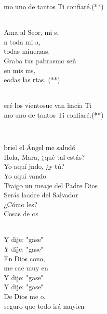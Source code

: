 \documentclass[12pt]{article}
\begin{document}
\begin{multicols*}{2}
\begin{cancion}[Hacia Ti][Ixcís]
\begin{chorus}
	mo uno de tantos Ti confiaré.(**)\\
	\end{chorus}%
	\jump\\
	Ama al Seor, mi s, \\
	n toda mi a, \\
	 todas miuerzas.\\
	Graba tus pabrasmo señ  \\
	en mis ms, \\
	eodas las rtas. (**)\\\jump\\
	\begin{chorus}%
	eré los vientosue van hacia Ti\\
	mo uno de tantos Ti confiaré.(**)\\
	\end{chorus}%
	\jump\\
\end{cancion}%

\begin{cancion}[Hágase][Migueli]%
	briel el Ángel me saludó\\
	Hola, Mara, ¿qué tal estás?\\
	Yo aquí jndo, ¿y tú?\\
	Yo aquí vando\\
	Traigo un meaje del Padre Dios\\
	Serás laadre del Salvador\\
	¿Cómo les?\\
	Cosas de os\\\jump\\
	\begin{chorus}%
	Y dije: "gase" \\
	Y dije: "gase" \\
	En Dios cono, \\
	me cae muy en\\
	Y dije: "gase" \\
	Y dije: "gase" \\
	De Dios me o,\\
	seguro que todo irá muyien\\
	\end{chorus}%
	\jump\\
\end{cancion}%


\end{multicols*}
\end{document}
